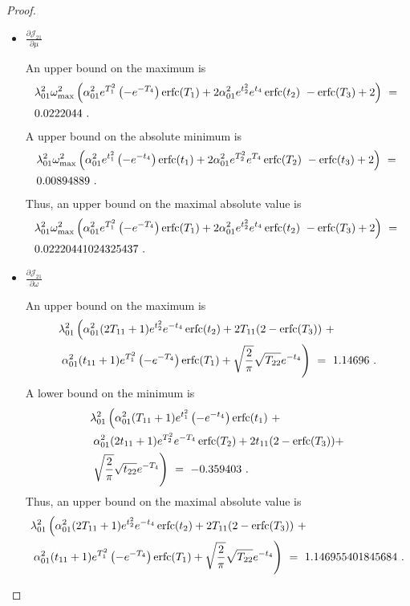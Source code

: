 \documentclass{article}
\DeclareMathOperator{\erfc}{erfc}
\begin{document}
\begin{proof}
\begin{itemize}
\item $\frac{\partial {\mathcal J}_{21}}{\partial \mu}$

An upper bound on the maximum is
\begin{align}
&\lambda_{\rm 01}^2 \omega_{\rm max}^2 \left(\alpha_{\rm 01}^2
  e^{T_1^2} \left(-e^{-T_4}\right)
  \erfc (T_1)+2 \alpha_{\rm 01}^2
  e^{t_2^2} e^{t_4}
  \erfc (t_2)\ - \erfc (T_3)+2\right) \ = \ \\ \nonumber
& 0.0222044\ .
\end{align}
A upper bound on the absolute minimum is
\begin{align}
&\lambda_{\rm 01}^2 \omega_{\rm max}^2 \left(\alpha_{\rm 01}^2
  e^{t_1^2} \left(-e^{-t_4}\right)
  \erfc (t_1)+2 \alpha_{\rm 01}^2
  e^{T_2^2} e^{T_4}
  \erfc (T_2)\ -  \erfc (t_3)+2\right) \ = \  \\ \nonumber
& 0.00894889\ .
\end{align}
Thus, an upper bound on the maximal absolute value is 
\begin{align}
&\lambda_{\rm 01}^2 \omega_{\rm max}^2 \left(\alpha_{\rm 01}^2
  e^{T_1^2} \left(-e^{-T_4}\right)
  \erfc (T_1)+2 \alpha_{\rm 01}^2
  e^{t_2^2} e^{t_4}
  \erfc (t_2)\ - \erfc (T_3)+2\right) \ = \ \\ \nonumber
&0.02220441024325437 \ .
\end{align}

\item $\frac{\partial {\mathcal J}_{21}}{\partial \omega}$

An upper bound on the maximum is
\begin{align}
&\lambda_{\rm 01}^2 \left(\alpha_{\rm 01}^2 (2 T_{11}+1)
  e^{t_2^2} e^{-t_4} \erfc (t_2)+2
  T_{11} (2-\erfc (T_3))\ + \right. \\
  \nonumber &\left. \alpha_{\rm 01}^2
  (t_{11}+1) e^{T_1^2}
  \left(-e^{-T_4}\right)
  \erfc (T_1)+\sqrt{\frac{2}{\pi }}
  \sqrt{T_{22}} e^{-t_4}\right) \ = \
1.14696 \ .
\end{align}
A lower bound on the minimum is
\begin{align}
&\lambda_{\rm 01}^2 \left(\alpha_{\rm 01}^2 (T_{11}+1)
  e^{t_1^2} \left(-e^{-t_4}\right)
  \erfc (t_1)\ + \right. \\
  \nonumber &\left. \alpha_{\rm 01}^2 (2 t_{11}+1)
  e^{T_2^2} e^{-T_4} \erfc (T_2)+2
  t_{11} (2-\erfc (T_3))+ \right.\\  \nonumber 
&\left. \sqrt{\frac{2}{\pi }}
  \sqrt{t_{22}} e^{-T_4}\right) \ = \
-0.359403\ .
\end{align}
Thus, an upper bound on the maximal absolute value is 
\begin{align}
&\lambda_{\rm 01}^2 \left(\alpha_{\rm 01}^2 (2 T_{11}+1)
  e^{t_2^2} e^{-t_4} \erfc (t_2)+2
  T_{11} (2-\erfc (T_3))\ + \right. \\
  \nonumber &\left. \alpha_{\rm 01}^2
  (t_{11}+1) e^{T_1^2}
  \left(-e^{-T_4}\right)
  \erfc (T_1)+\sqrt{\frac{2}{\pi }}
  \sqrt{T_{22}} e^{-t_4}\right) \ = \
1.146955401845684 \ .
\end{align}


\end{itemize}
\end{proof}
\end{document}
